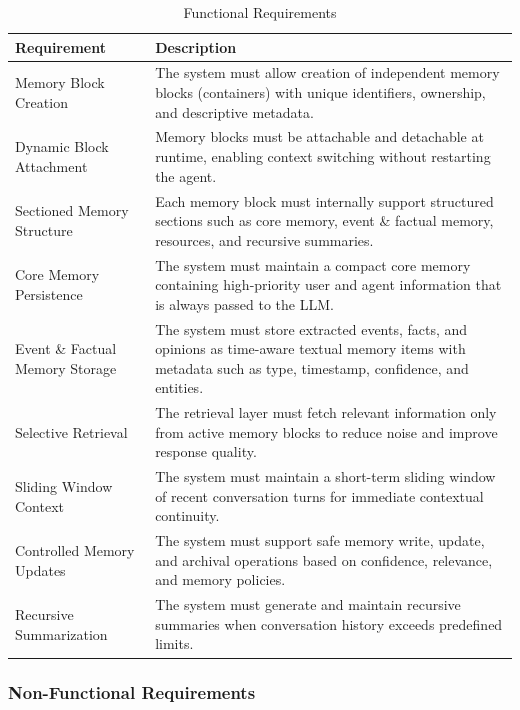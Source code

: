 ﻿\documentclass[12pt,a4paper]{article}
\begin{document}
\begin{table}[H]
\centering
\small
\begin{tabular}{|p{4cm}|p{10cm}|}
\hline
\textbf{Requirement} & \textbf{Description} \\
\hline
Memory Block Creation & The system must allow creation of independent memory blocks (containers) with unique identifiers, ownership, and descriptive metadata. \\
\hline
Dynamic Block Attachment & Memory blocks must be attachable and detachable at runtime, enabling context switching without restarting the agent. \\
\hline
Sectioned Memory Structure & Each memory block must internally support structured sections such as core memory, event \& factual memory, resources, and recursive summaries. \\
\hline
Core Memory Persistence & The system must maintain a compact core memory containing high-priority user and agent information that is always passed to the LLM. \\
\hline
Event \& Factual Memory Storage & The system must store extracted events, facts, and opinions as time-aware textual memory items with metadata such as type, timestamp, confidence, and entities. \\
\hline
Selective Retrieval & The retrieval layer must fetch relevant information only from active memory blocks to reduce noise and improve response quality. \\
\hline
Sliding Window Context & The system must maintain a short-term sliding window of recent conversation turns for immediate contextual continuity. \\
\hline
Controlled Memory Updates & The system must support safe memory write, update, and archival operations based on confidence, relevance, and memory policies. \\
\hline
Recursive Summarization & The system must generate and maintain recursive summaries when conversation history exceeds predefined limits. \\
\hline
\end{tabular}
\caption{Functional Requirements}
\label{tab:functional_requirements}
\end{table}

\subsubsection{Non-Functional Requirements}
\end{document}
